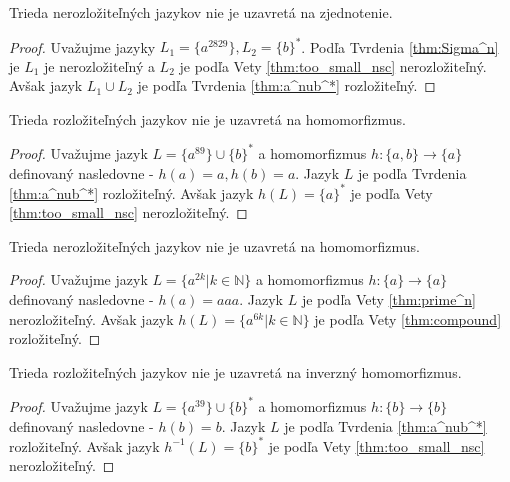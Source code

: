 \begin{proposition}
Trieda nerozložiteľných jazykov nie je uzavretá na zjednotenie.
\end{proposition}

\begin{proof}
Uvažujme jazyky $ L_1 = \lbrace a^{2829} \rbrace, L_2 = \lbrace b \rbrace^* $. Podľa Tvrdenia \ref{thm:Sigma^n} je $ L_1 $ je nerozložiteľný a $ L_2 $ je podľa Vety \ref{thm:too_small_nsc} nerozložiteľný. Avšak jazyk $ L_1 \cup L_2 $ je podľa Tvrdenia \ref{thm:a^nub^*} rozložiteľný.
\end{proof}

\begin{proposition}
Trieda rozložiteľných jazykov nie je uzavretá na homomorfizmus.
\end{proposition}

\begin{proof}
Uvažujme jazyk $ L = \lbrace a^{89} \rbrace \cup \lbrace b \rbrace^* $ a homomorfizmus $ h : \lbrace a,b \rbrace \rightarrow \lbrace a \rbrace $ definovaný nasledovne - $ h(a) = a, h(b) = a $. Jazyk $ L $ je podľa Tvrdenia \ref{thm:a^nub^*} rozložiteľný. Avšak jazyk $ h(L) = \lbrace a \rbrace^*$ je podľa Vety \ref{thm:too_small_nsc} nerozložiteľný.
\end{proof}

\begin{proposition}
Trieda nerozložiteľných jazykov nie je uzavretá na homomorfizmus.
\end{proposition}

\begin{proof}
Uvažujme jazyk $ L = \lbrace a^{2k} | k \in \mathbb{N} \rbrace $ a homomorfizmus $ h : \lbrace a \rbrace \rightarrow \lbrace a \rbrace $ definovaný nasledovne - $ h(a) = aaa $. Jazyk $ L $ je podľa Vety \ref{thm:prime^n} nerozložiteľný. Avšak jazyk $ h(L) = \lbrace a^{6k} | k \in \mathbb{N} \rbrace $ je podľa Vety \ref{thm:compound} rozložiteľný.
\end{proof}

\begin{proposition}
Trieda rozložiteľných jazykov nie je uzavretá na inverzný homomorfizmus.
\end{proposition}

\begin{proof}
Uvažujme jazyk $ L = \lbrace a^{39} \rbrace \cup \lbrace b \rbrace^* $ a homomorfizmus $ h : \lbrace b \rbrace \rightarrow \lbrace b \rbrace $ definovaný nasledovne - $ h(b) = b $. Jazyk $ L $ je podľa Tvrdenia \ref{thm:a^nub^*} rozložiteľný. Avšak jazyk $ h^{-1}(L) = \lbrace b \rbrace^*$ je podľa Vety \ref{thm:too_small_nsc} nerozložiteľný.
\end{proof}

